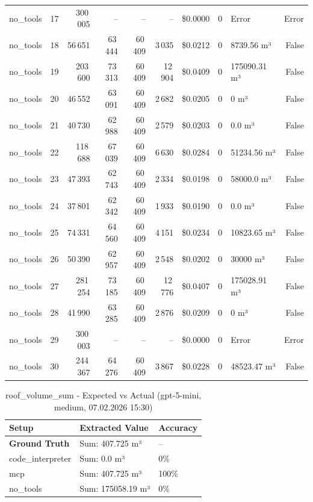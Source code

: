 \documentclass[a4paper,11pt]{article}
\begin{document}
\begin{table}[H]
{\begin{tabular}{l r r r r r r r l r}
no\_tools & 17 & 300\,005 & -- & -- & -- & \$0.0000 & 0 & Error & Error \\
no\_tools & 18 & 56\,651 & 63\,444 & 60\,409 & 3\,035 & \$0.0212 & 0 & 8739.56 m³ & False \\
no\_tools & 19 & 203\,600 & 73\,313 & 60\,409 & 12\,904 & \$0.0409 & 0 & 175090.31 m³ & False \\
no\_tools & 20 & 46\,552 & 63\,091 & 60\,409 & 2\,682 & \$0.0205 & 0 & 0 m³ & False \\
no\_tools & 21 & 40\,730 & 62\,988 & 60\,409 & 2\,579 & \$0.0203 & 0 & 0.0 m³ & False \\
no\_tools & 22 & 118\,688 & 67\,039 & 60\,409 & 6\,630 & \$0.0284 & 0 & 51234.56 m³ & False \\
no\_tools & 23 & 47\,393 & 62\,743 & 60\,409 & 2\,334 & \$0.0198 & 0 & 58000.0 m³ & False \\
no\_tools & 24 & 37\,801 & 62\,342 & 60\,409 & 1\,933 & \$0.0190 & 0 & 0.0 m³ & False \\
no\_tools & 25 & 74\,331 & 64\,560 & 60\,409 & 4\,151 & \$0.0234 & 0 & 10823.65 m³ & False \\
no\_tools & 26 & 50\,390 & 62\,957 & 60\,409 & 2\,548 & \$0.0202 & 0 & 30000 m³ & False \\
no\_tools & 27 & 281\,254 & 73\,185 & 60\,409 & 12\,776 & \$0.0407 & 0 & 175028.91 m³ & False \\
no\_tools & 28 & 41\,990 & 63\,285 & 60\,409 & 2\,876 & \$0.0209 & 0 & 0 m³ & False \\
no\_tools & 29 & 300\,003 & -- & -- & -- & \$0.0000 & 0 & Error & Error \\
no\_tools & 30 & 244\,367 & 64\,276 & 60\,409 & 3\,867 & \$0.0228 & 0 & 48523.47 m³ & False \\
\bottomrule
\end{tabular}}
\end{table}

\begin{table}[H]
\centering
\scriptsize
\caption{roof\_volume\_sum - Expected vs Actual (gpt-5-mini, medium, 07.02.2026 15:30)}
\begin{tabular}{l l l}
\toprule
Setup & Extracted Value & Accuracy \\
\midrule
\textbf{Ground Truth} & Sum: 407.725 m³ & -- \\
\midrule
code\_interpreter & Sum: 0.0 m³ & 0\% \\
mcp & Sum: 407.725 m³ & 100\% \\
no\_tools & Sum: 175058.19 m³ & 0\% \\
\bottomrule
\end{tabular}
\end{table}
\end{document}

